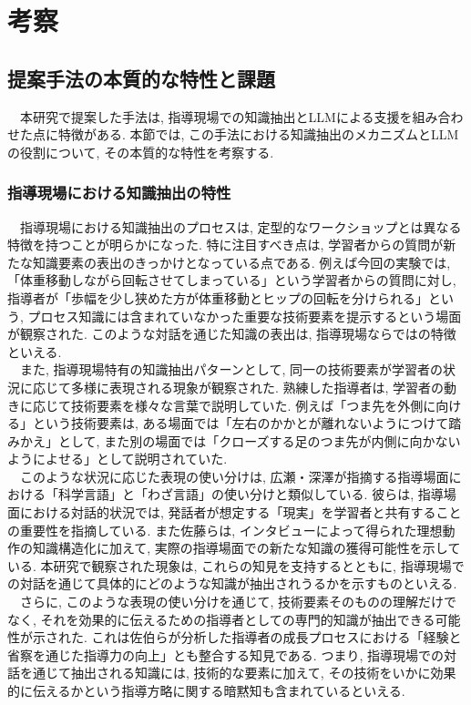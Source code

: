 \chapter{考察}
\section{提案手法の本質的な特性と課題}
　本研究で提案した手法は, 指導現場での知識抽出とLLMによる支援を組み合わせた点に特徴がある. 本節では, この手法における知識抽出のメカニズムとLLMの役割について, その本質的な特性を考察する.

\subsection{指導現場における知識抽出の特性}
　指導現場における知識抽出のプロセスは, 定型的なワークショップとは異なる特徴を持つことが明らかになった. 特に注目すべき点は, 学習者からの質問が新たな知識要素の表出のきっかけとなっている点である. 例えば今回の実験では, 「体重移動しながら回転させてしまっている」という学習者からの質問に対し, 指導者が「歩幅を少し狭めた方が体重移動とヒップの回転を分けられる」という, プロセス知識には含まれていなかった重要な技術要素を提示するという場面が観察された. このような対話を通じた知識の表出は, 指導現場ならではの特徴といえる.\\
　また, 指導現場特有の知識抽出パターンとして, 同一の技術要素が学習者の状況に応じて多様に表現される現象が観察された. 熟練した指導者は, 学習者の動きに応じて技術要素を様々な言葉で説明していた. 例えば「つま先を外側に向ける」という技術要素は, ある場面では「左右のかかとが離れないようにつけて踏みかえ」として, また別の場面では「クローズする足のつま先が内側に向かないようによせる」として説明されていた. \\
　このような状況に応じた表現の使い分けは, 広瀬・深澤\cite{Hirose2018}が指摘する指導場面における「科学言語」と「わざ言語」の使い分けと類似している. 彼らは, 指導場面における対話的状況では, 発話者が想定する「現実」を学習者と共有することの重要性を指摘している. また佐藤ら\cite{Sato2024}は, インタビューによって得られた理想動作の知識構造化に加えて, 実際の指導場面での新たな知識の獲得可能性を示している. 本研究で観察された現象は, これらの知見を支持するとともに, 指導現場での対話を通じて具体的にどのような知識が抽出されうるかを示すものといえる.\\
　さらに, このような表現の使い分けを通じて, 技術要素そのものの理解だけでなく, それを効果的に伝えるための指導者としての専門的知識が抽出できる可能性が示された. これは佐伯ら\cite{Saeki2017}が分析した指導者の成長プロセスにおける「経験と省察を通じた指導力の向上」とも整合する知見である. つまり, 指導現場での対話を通じて抽出される知識には, 技術的な要素に加えて, その技術をいかに効果的に伝えるかという指導方略に関する暗黙知も含まれているといえる.\\
